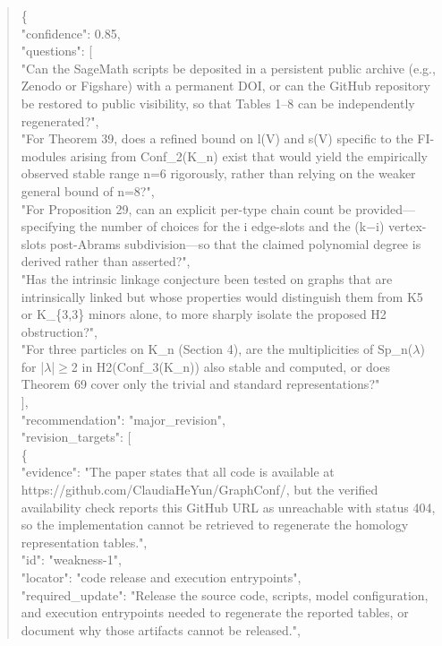 \documentclass[11pt]{article}
\begin{document}
\begin{quote}\small\ttfamily\raggedright
\{\\
  "confidence": 0.85,\\
  "questions": [\\
    "Can the SageMath scripts be deposited in a persistent public archive (e.g., Zenodo or Figshare) with a permanent DOI, or can the GitHub repository be restored to public visibility, so that Tables 1--8 can be independently regenerated?",\\
    "For Theorem 39, does a refined bound on l(V) and s(V) specific to the FI-modules arising from Conf\_2(K\_n) exist that would yield the empirically observed stable range n=6 rigorously, rather than relying on the weaker general bound of n=8?",\\
    "For Proposition 29, can an explicit per-type chain count be provided---specifying the number of choices for the i edge-slots and the (k\ensuremath{-}i) vertex-slots post-Abrams subdivision---so that the claimed polynomial degree is derived rather than asserted?",\\
    "Has the intrinsic linkage conjecture been tested on graphs that are intrinsically linked but whose properties would distinguish them from K5 or K\_\{3,3\} minors alone, to more sharply isolate the proposed H2 obstruction?",\\
    "For three particles on K\_n (Section 4), are the multiplicities of Sp\_n(\ensuremath{\lambda}) for |\ensuremath{\lambda}|\ensuremath{\ge}2 in H2(Conf\_3(K\_n)) also stable and computed, or does Theorem 69 cover only the trivial and standard representations?"\\
  ],\\
  "recommendation": "major\_revision",\\
  "revision\_targets": [\\
    \{\\
      "evidence": "The paper states that all code is available at https://github.com/ClaudiaHeYun/GraphConf/, but the verified availability check reports this GitHub URL as unreachable with status 404, so the implementation cannot be retrieved to regenerate the homology representation tables.",\\
      "id": "weakness-1",\\
      "locator": "code release and execution entrypoints",\\
      "required\_update": "Release the source code, scripts, model configuration, and execution entrypoints needed to regenerate the reported tables, or document why those artifacts cannot be released.",\\

\end{quote}
\end{document}
